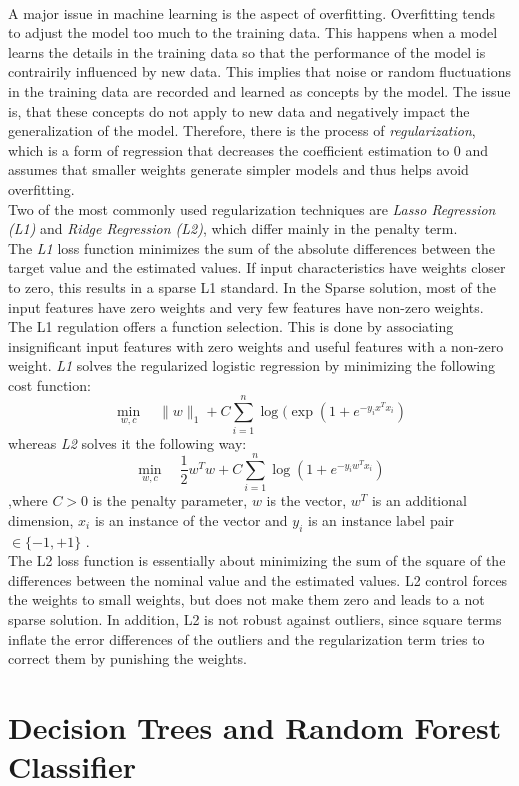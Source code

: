 \documentclass[a4paper, 11pt,titlepage,oneside,openany]{book}
\begin{document}
\\ A major issue in machine learning is the aspect of overfitting. Overfitting tends to adjust the model too much to the training data. This happens when a model learns the details in the training data so that the performance of the model is contrairily influenced by new data. This implies that noise or random fluctuations in the training data are recorded and learned as concepts by the model. The issue is, that these concepts do not apply to new data and negatively impact the generalization of the model. Therefore, there is the process of \textit{regularization}, which is a form of regression that decreases the coefficient estimation to $0$ and assumes that smaller weights generate simpler models and thus helps avoid overfitting. \\
\noindent Two of the most commonly used regularization techniques are \textit{Lasso Regression (L1)} and \textit{Ridge Regression (L2)}, which differ mainly in the penalty term. \\
\noindent The \textit{L1} loss function minimizes the sum of the absolute differences between the target value and the estimated values. If input characteristics have weights closer to zero, this results in a sparse L1 standard. In the Sparse solution, most of the input features have zero weights and very few features have non-zero weights. The L1 regulation offers a function selection. This is done by associating insignificant input features with zero weights and useful features with a non-zero weight. \noindent \textit{L1} solves the regularized logistic regression by minimizing the following cost function:
\[
\min_{w, c} \quad \|w\|_1 + C \sum_{i=1}^n \log(\exp(1+e^{-y_ix^Tx_i})
\]
whereas \textit{L2} solves it the following way:
\[
\min_{w, c} \quad \frac{1}{2}w^T w + C \sum_{i=1}^n \log(1+e^{-y_iw^Tx_i})
\]
,where $C>0$ is the penalty parameter, $w$ is the vector, $w^T$ is an additional dimension, $x_i$ is an instance of the vector and $y_i$ is an instance label pair $\in \{-1,+1\}$ \cite{liblinear}.\\
The L2 loss function is essentially about minimizing the sum of the square of the differences between the nominal value and the estimated values.
L2 control forces the weights to small weights, but does not make them zero and leads to a not sparse solution. In addition, L2 is not robust against outliers, since square terms inflate the error differences of the outliers and the regularization term tries to correct them by punishing the weights.


\section{Decision Trees and Random Forest Classifier}
\end{document}
